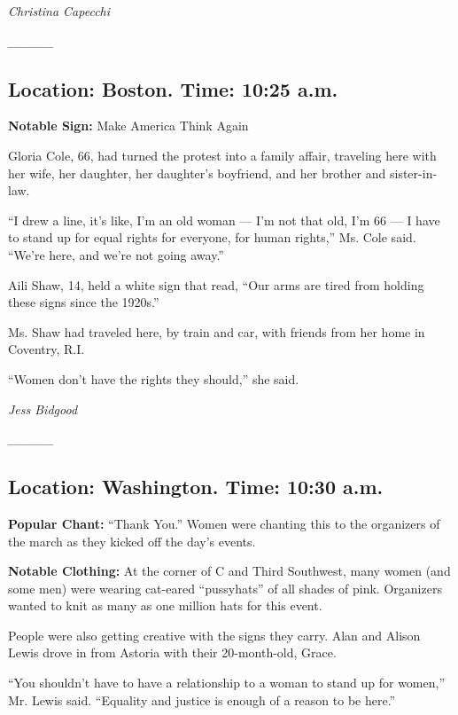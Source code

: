 \emph{Christina Capecchi}

\emph{\_\_\_\_\_}

\hypertarget{location-boston-time-1025-am}{%
\subsection{Location: Boston. Time: 10:25
a.m.}\label{location-boston-time-1025-am}}

\textbf{Notable Sign:} Make America Think Again

Gloria Cole, 66, had turned the protest into a family affair, traveling
here with her wife, her daughter, her daughter's boyfriend, and her
brother and sister-in-law.

``I drew a line, it's like, I'm an old woman --- I'm not that old, I'm
66 --- I have to stand up for equal rights for everyone, for human
rights,'' Ms. Cole said. ``We're here, and we're not going away.''

Aili Shaw, 14, held a white sign that read, ``Our arms are tired from
holding these signs since the 1920s.''

Ms. Shaw had traveled here, by train and car, with friends from her home
in Coventry, R.I.

``Women don't have the rights they should,'' she said.

\emph{Jess Bidgood}

\emph{\_\_\_\_\_}

\hypertarget{location-washington-time-1030-am}{%
\subsection{Location: Washington. Time: 10:30
a.m.}\label{location-washington-time-1030-am}}

\textbf{Popular Chant:} ``Thank You.'' Women were chanting this to the
organizers of the march as they kicked off the day's events.

\textbf{Notable Clothing:} At the corner of C and Third Southwest, many
women (and some men) were wearing cat-eared ``pussyhats'' of all shades
of pink. Organizers wanted to knit as many as one million hats for this
event.

People were also getting creative with the signs they carry. Alan and
Alison Lewis drove in from Astoria with their 20-month-old, Grace.

``You shouldn't have to have a relationship to a woman to stand up for
women,'' Mr. Lewis said. ``Equality and justice is enough of a reason to
be here.''

